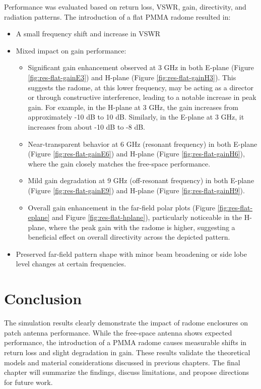 Performance was evaluated based on return loss, VSWR, gain, directivity, and radiation patterns. The introduction of a flat PMMA radome resulted in:
\begin{itemize}
\item A small frequency shift and increase in VSWR 
\item Mixed impact on gain performance:
\begin{itemize}
\item Significant gain enhancement observed at 3 GHz in both E-plane (Figure \ref{fig:res-flat-gainE3}) and H-plane (Figure \ref{fig:res-flat-gainH3}). This suggests the radome, at this lower frequency, may be acting as a director or through constructive interference, leading to a notable increase in peak gain. For example, in the H-plane at 3 GHz, the gain increases from approximately -10 dB to 10 dB. Similarly, in the E-plane at 3 GHz, it increases from about -10 dB to -8 dB.
\item Near-transparent behavior at 6 GHz (resonant frequency) in both E-plane (Figure \ref{fig:res-flat-gainE6}) and H-plane (Figure \ref{fig:res-flat-gainH6}), where the gain closely matches the free-space performance.
\item Mild gain degradation at 9 GHz (off-resonant frequency) in both E-plane (Figure \ref{fig:res-flat-gainE9}) and H-plane (Figure \ref{fig:res-flat-gainH9}).
\item Overall gain enhancement in the far-field polar plots (Figure \ref{fig:res-flat-eplane} and Figure \ref{fig:res-flat-hplane}), particularly noticeable in the H-plane, where the peak gain with the radome is higher, suggesting a beneficial effect on overall directivity across the depicted pattern.
\end{itemize}
\item Preserved far-field pattern shape with minor beam broadening or side lobe level changes at certain frequencies.
\end{itemize}

\section*{Conclusion}

The simulation results clearly demonstrate the impact of radome enclosures on patch antenna performance. While the free-space antenna shows expected performance, the introduction of a PMMA radome causes measurable shifts in return loss and slight degradation in gain. These results validate the theoretical models and material considerations discussed in previous chapters. The final chapter will summarize the findings, discuss limitations, and propose directions for future work.
